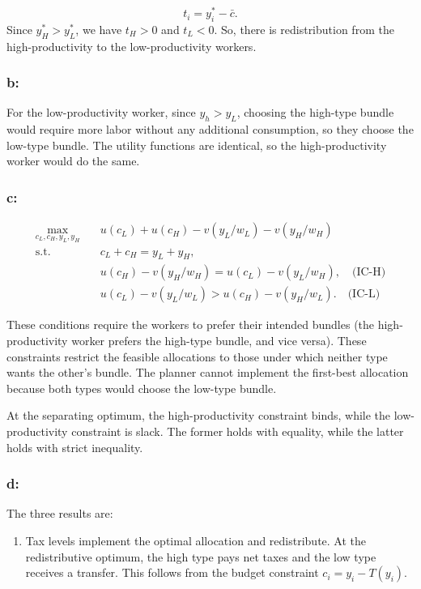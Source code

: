 \documentclass[
  letterpaper,
  DIV=11,
  numbers=noendperiod]{scrartcl}
\providecommand{\tightlist}{%
  \setlength{\itemsep}{0pt}\setlength{\parskip}{0pt}}
\begin{document}
\[
t_i=y_i^*-\bar{c}.
\] Since \(y_H^*>y_L^*\), we have \(t_H>0\) and \(t_L<0\). So, there is
redistribution from the high-productivity to the low-productivity
workers.

\subsubsection{b:}\label{b}

For the low-productivity worker, since \(y_h>y_L\), choosing the
high-type bundle would require more labor without any additional
consumption, so they choose the low-type bundle. The utility functions
are identical, so the high-productivity worker would do the same.

\subsubsection{c:}\label{c}

\[
\begin{aligned}
\max_{c_L,c_H,y_L,y_H}\quad
&u(c_L)+u(c_H)
-v(y_L/w_L)-v(y_H/w_H)\\
\text{s.t.}\quad
&c_L+c_H=y_L+y_H,\\
\quad
&u(c_H)-v(y_H/w_H)
= u(c_L)-v(y_L/w_H), \quad \text{(IC-H)} \\
\quad
&u(c_L)-v(y_L/w_L)
> u(c_H)-v(y_H/w_L). \quad \text{(IC-L)}
\end{aligned}
\]

These conditions require the workers to prefer their intended bundles
(the high-productivity worker prefers the high-type bundle, and vice
versa). These constraints restrict the feasible allocations to those
under which neither type wants the other's bundle. The planner cannot
implement the first-best allocation because both types would choose the
low-type bundle.

At the separating optimum, the high-productivity constraint binds, while
the low-productivity constraint is slack. The former holds with
equality, while the latter holds with strict inequality.

\subsubsection{d:}\label{d}

The three results are:

\begin{enumerate}
\def\labelenumi{\arabic{enumi}.}
\tightlist
\item
  Tax levels implement the optimal allocation and redistribute. At the
  redistributive optimum, the high type pays net taxes and the low type
  receives a transfer. This follows from the budget constraint
  \(c_i=y_i-T(y_i)\).
\end{enumerate}
\end{document}
